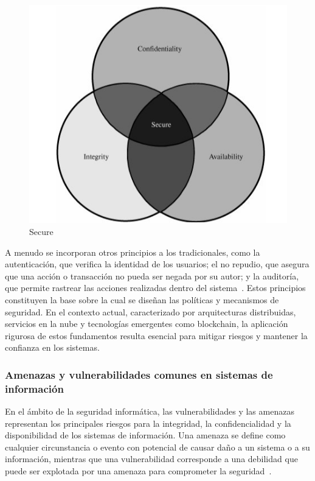 \begin{figure}[H]
    \centering
    \includegraphics[scale=0.99]{figuras/secure.png}
    \caption{Secure~\cite{Stallings2017}} 
\end{figure}
A menudo se incorporan otros principios a los tradicionales, como la autenticación, que verifica la identidad de los usuarios; el no repudio, que asegura que una acción o transacción no pueda ser negada por su autor; y la auditoría, que permite rastrear las acciones realizadas dentro del sistema~\cite{Bishop2018}.
Estos principios constituyen la base sobre la cual se diseñan las políticas y mecanismos de seguridad. En el contexto actual, caracterizado por arquitecturas distribuidas, servicios en la nube y tecnologías emergentes como blockchain, la aplicación rigurosa de estos fundamentos resulta esencial para mitigar riesgos y mantener la confianza en los sistemas.

\subsubsection{Amenazas y vulnerabilidades comunes en sistemas de información}
En el ámbito de la seguridad informática, las vulnerabilidades y las amenazas representan los principales riesgos para la integridad, la confidencialidad y la disponibilidad de los sistemas de información. Una amenaza se define como cualquier circunstancia o evento con potencial de causar daño a un sistema o a su información, mientras que una vulnerabilidad corresponde a una debilidad que puede ser explotada por una amenaza para comprometer la seguridad~\cite{Stallings2018}.

